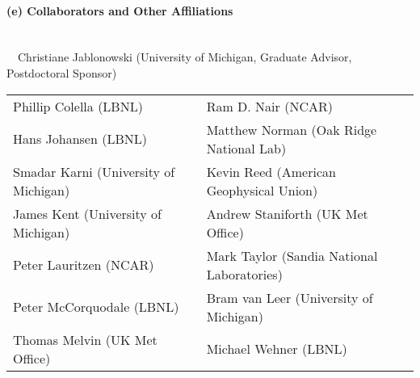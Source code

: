 \documentclass[11pt]{article}
\begin{document}
\vspace{-0.5cm}
\paragraph{\large (e) Collaborators and Other Affiliations}\ \\

\vspace{-0.5cm}
\ \ Christiane Jablonowski (University of Michigan, Graduate Advisor, Postdoctoral Sponsor)

\noindent
\begin{tabular}{p{3.25in}p{3.25in}}
Phillip Colella (LBNL) & Ram D. Nair (NCAR) \\
Hans Johansen (LBNL) & Matthew Norman (Oak Ridge National Lab) \\
Smadar Karni (University of Michigan) & Kevin Reed (American Geophysical Union) \\
James Kent (University of Michigan) & Andrew Staniforth (UK Met Office) \\
Peter Lauritzen (NCAR) & Mark Taylor (Sandia National Laboratories) \\
Peter McCorquodale (LBNL) & Bram van Leer (University of Michigan) \\
Thomas Melvin (UK Met Office) & Michael Wehner (LBNL) \\
\end{tabular}
\end{document}
